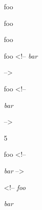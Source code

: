 
\def\mytitle{HTML Comments}


foo 

foo 

foo 

foo <!--
\emph{bar}

-->

foo <!--

\emph{bar}

-->

5

foo <!--

\emph{bar} -->

<!-- \emph{foo}

\emph{bar}



